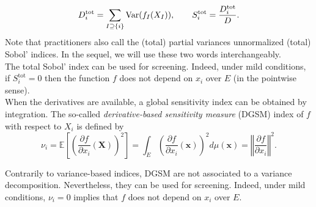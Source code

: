 \documentclass[a4paper,11pt]{article}
\newcommand{\ve}[1]{\boldsymbol{#1}}
\newcommand{\Var}{{\rm Var}}
\newcommand{\Esp}[1]{{\mathbb E}\left[ #1 \right]}
\renewcommand{\citep}[2][]{\cite[#1]{#2}}
\theoremstyle{definition}
\theoremstyle{remark}
\theoremstyle{theorem}
\begin{document}
\begin{equation*}
D_i^\textrm{tot} = \sum_{I \supseteq \{i \}} \Var(f_I(X_I)), \qquad S_i^\textrm{tot} = \frac{D_i^\textrm{tot}}{D}.
\end{equation*}
Note that practitioners also call the (total) partial variances unnormalized (total) Sobol' indices. In the sequel, we will use these two words interchangeably.\\
The total Sobol' index can be used for screening. Indeed, under mild conditions, if $S_i^\textrm{tot} = 0$ then the function $f$ does not depend on $x_i$ over $E$ (in the pointwise sense).\\

When the derivatives are available, a global sensitivity index can be obtained by integration. The so-called \textit{derivative-based sensitivity measure} (DGSM) index of $f$ with respect to $X_i$ \citep{Sobol_Gresham_1995,Kucherenko2009} is defined by 
\begin{equation} \label{eq:DGSM}
\nu_i = \Esp{\left( \frac{\partial f}{\partial x_i}(\ve X) \right)^2 } 
= \int_{E} \left( \frac{\partial f}{\partial x_i}(\ve x) \right)^2 d\mu(\ve x) 
= \left\Vert \frac{\partial f}{\partial x_i} \right\Vert^2 .
\end{equation}


Contrarily to variance-based indices, DGSM are not associated to a variance decomposition. Nevertheless, they can be used for screening. Indeed, under mild conditions, $\nu_i = 0$ implies that $f$ does not depend on $x_i$ over $E$.
\end{document}
